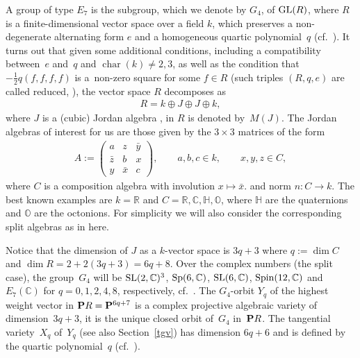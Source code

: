 \documentclass[10pt,a4paper]{amsart}
\newcommand{\RR}{{\mathbb R}}
\newcommand{\CC}{{\mathbb C}}
\newcommand{\HH}{{\mathbb H}}
\newcommand{\OO}{{\mathbb O}}
\newcommand{\PP}{{\bf P}}
\numberwithin{equation}{section}
\begin{document}
A group of type $E_7$ is the subgroup, which we denote by $G_4$, of ${\rm GL}(R)$, where $R$ is a finite-dimensional vector space over a field $k$, which preserves a non-degenerate alternating form $e$ and a homogeneous quartic polynomial~$q$ (cf.~\cite{Brown,Kru}). It turns out that given some additional conditions, including a compatibility between~$e$ and~$q$ and $\operatorname{char}(k)\ne 2,3$, as well as the condition that $- \frac{1}{2} q(f,f,f,f)$ is a~non-zero square for some $f\in R$ (such triples $(R,q,e)$ are called reduced, \cite[p.~90]{Brown}), the vector space $R$ decomposes as
\begin{gather*}
R = k\oplus J \oplus J \oplus k,
\end{gather*}
where $J$ is a (cubic) Jordan algebra \cite{ja}, in \cite[Section~3.1]{Kru} $R$ is denoted by~$M(J)$. The Jordan algebras of interest for us are those given by the $3\times 3$ matrices of the form
\begin{gather*}
A := \begin{pmatrix} a&z&\bar{y}\\\bar{z}&b&x\\y&\bar{x}&c\end{pmatrix},\qquad a,b,c\in k,\qquad x,y,z\in C,
\end{gather*}
where   $C$ is a composition algebra with involution $x\mapsto \bar{x}$. and norm $n\colon C\rightarrow k$. The best known examples are $k=\RR$ and $C=\RR,\CC,\HH,\OO$, where $\HH$ are the quaternions and $\OO$ are the octonions. For simplicity we will also consider the corresponding split algebras as in \cite[Section~2.1]{Kru} here.

 Notice that the dimension of $J$ as a $k$-vector space is $3q+3$ where $q:=\dim C$ and $\dim R=2+2(3q+3)=6q+8$. Over the complex numbers (the split case), the group~$G_4$ will be ${\rm SL}(2,\CC)^3$, ${\rm Sp}(6,\CC)$, ${\rm SL}(6,\CC)$, ${\rm Spin}(12,\CC)$ and $E_7(\CC)$ for $q=0,1,2,4,8$, respectively, cf.\ \cite[Table~3]{Holweck}. The $G_4$-orbit $Y_q$ of the highest weight vector in $\PP R=\PP^{6q+7}$ is a complex projective algebraic variety of dimension~$3q+3$, it is the unique closed orbit of~$G_4$ in~$\PP R$. The tangential variety~$X_q$ of~$Y_q$ (see also Section~\ref{tgv}) has dimension $6q+6$ and is defined by the quartic polynomial~$q$ (cf.~\cite{FGK,Holweck,LM}).
\end{document}
